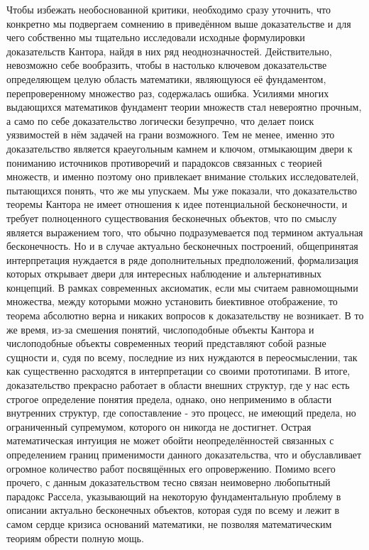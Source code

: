 \documentclass[12pt]{article}
\begin{document}
Чтобы избежать необоснованной критики, необходимо сразу уточнить, что конкретно мы подвергаем сомнению в приведённом выше доказательстве и для чего собственно мы тщательно исследовали исходные формулировки доказательств Кантора, найдя в них ряд неоднозначностей. Действительно, невозможно себе вообразить, чтобы в настолько ключевом доказательстве определяющем целую область математики, являющуюся её фундаментом, перепроверенному множество раз, содержалась ошибка. Усилиями многих выдающихся математиков фундамент теории множеств стал невероятно прочным, а само по себе доказательство логически безупречно, что делает поиск уязвимостей в нём задачей на грани возможного. Тем не менее, именно это доказательство является краеугольным камнем и ключом, отмыкающим двери к пониманию источников противоречий и парадоксов связанных с теорией множеств, и именно поэтому оно привлекает внимание стольких исследователей, пытающихся понять, что же мы упускаем. Мы уже показали, что доказательство теоремы Кантора не имеет отношения к идее потенциальной бесконечности, и требует полноценного существования бесконечных объектов, что по смыслу является выражением того, что обычно подразумевается под термином актуальная бесконечность. Но и в случае актуально бесконечных построений, общепринятая интерпретация нуждается в ряде дополнительных предположений, формализация которых открывает двери для интересных наблюдение и альтернативных концепций. В рамках современных аксиоматик, если мы считаем равномощными множества, между которыми можно установить биективное отображение, то теорема абсолютно верна и никаких вопросов к доказательству не возникает. В то же время, из-за смешения понятий, числоподобные объекты Кантора и числоподобные объекты современных теорий представляют собой разные сущности и, судя по всему, последние из них нуждаются в переосмыслении, так как существенно расходятся в интерпретации со своими прототипами. В итоге, доказательство прекрасно работает в области внешних структур, где у нас есть строгое определение понятия предела, однако, оно неприменимо в области внутренних структур, где сопоставление - это процесс, не имеющий предела, но ограниченный супремумом, которого он никогда не достигнет. Острая математическая интуиция не может обойти неопределённостей связанных с определением границ применимости данного доказательства, что и обуславливает огромное количество работ посвящённых его опровержению. Помимо всего прочего, с данным доказательством тесно связан неимоверно любопытный парадокс Рассела, указывающий на некоторую фундаментальную проблему в описании актуально бесконечных объектов, которая судя по всему и лежит в самом сердце кризиса оснований математики, не позволяя математическим теориям обрести полную мощь.
\end{document}
